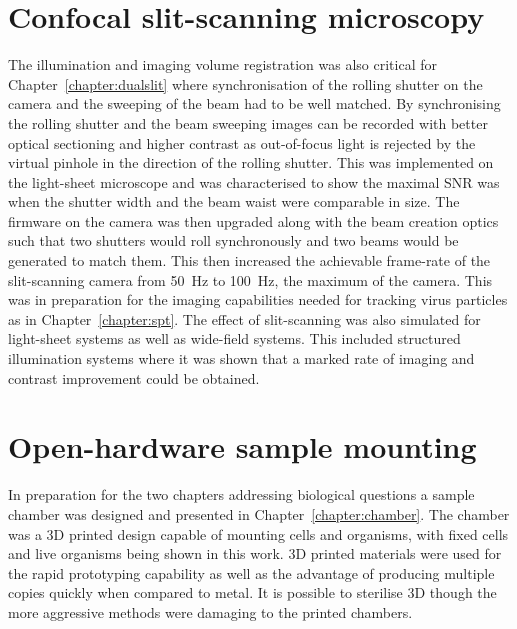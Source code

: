 \section{Confocal \gls{slit-scanning} microscopy}
The illumination and imaging volume registration was also critical for Chapter~\ref{chapter:dualslit} where synchronisation of the rolling shutter on the camera and the sweeping of the beam had to be well matched.
By synchronising the rolling shutter and the beam sweeping images can be recorded with better optical sectioning and higher contrast as out-of-focus light is rejected by the virtual pinhole in the direction of the rolling shutter.
This was implemented on the light-sheet microscope and was characterised to show the maximal \gls{SNR} was when the shutter width and the beam waist were comparable in size.
The firmware on the camera was then upgraded along with the beam creation optics such that two shutters would roll synchronously and two beams would be generated to match them.
This then increased the achievable frame-rate of the slit-scanning camera from \SI{50}{\hertz} to \SI{100}{\hertz}, the maximum of the camera.
This was in preparation for the imaging capabilities needed for tracking virus particles as in Chapter~\ref{chapter:spt}.
The effect of slit-scanning was also simulated for light-sheet systems as well as wide-field systems.
This included structured illumination systems where it was shown that a marked rate of imaging and contrast improvement could be obtained.

\section{Open-hardware sample mounting}
In preparation for the two chapters addressing biological questions a sample chamber was designed and presented in Chapter~\ref{chapter:chamber}.
The chamber was a \gls{3D} printed design capable of mounting cells  and organisms, with fixed cells and live organisms being shown in this work.
\gls{3D} printed materials were used for the rapid prototyping capability as well as the advantage of producing multiple copies quickly when compared to metal.
It is possible to sterilise \gls{3D} though the more aggressive methods were damaging to the printed chambers.

